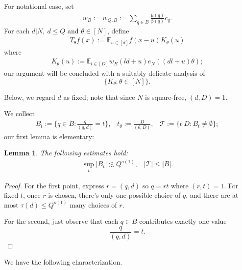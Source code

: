 \documentclass[12pt]{amsart}
\numberwithin{equation}{section}
\newtheorem{proposition}[theorem]{Proposition}
\newtheorem{lemma}[theorem]{Lemma}
\theoremstyle{definition}
\begin{document}
For notational ease, set
\begin{align}
    w_B := w_{Q,B} := \sum_{q \in B} \frac{\mu(q)}{\phi(q)} c_q.
\end{align}
For each $d | N, \ d \leq Q$ and $\theta \in [N]$, define
\begin{align}
T_\theta f(x) := \mathbb{E}_{u \in [d]} f(x-u) K_\theta(u)   
\end{align}
where
\begin{align}
K_\theta(u) := \mathbb E_{l\in[D]} w_B(ld+u) e_N((dl+u)\theta);
\end{align}
our argument will be concluded with a suitably delicate analysis of 
\[ \{ K_\theta : \theta \in [N]\}.\]

Below, we regard $d$ as fixed; note that since $N$ is square-free, $(d,D) =1$.


We collect
\begin{align}
    B_t :=\{ q \in B : \frac{q}{(q,d)} = t \}, \; \; \;  t_\theta := \frac{D}{(\theta,D)}, \; \; \; \mathcal{T} := \{ t | D : B_t \neq \emptyset \};
\end{align} 
our first lemma is elementary:
\begin{lemma}\label{l:elemestat}
The following estimates hold:
\begin{align}
\sup_t |B_t| \lesssim Q^{o(1)}, \; \; \; |\mathcal{T}| \leq |B|.   
\end{align}
\end{lemma}
\begin{proof}
For the first point, express $r = (q,d)$ so $q = rt$ where $(r,t) = 1$. For fixed $t$, once $r$ is chosen, there's only one possible choice of $q$, and there are at most $\tau(d) \leq Q^{o(1)}$ many choices of $r$.

For the second, just observe that each $q \in B$ contributes exactly one value 
\[ \frac{q}{(q,d)} = t.\]
\end{proof}


We have the following characterization.
\end{document}
